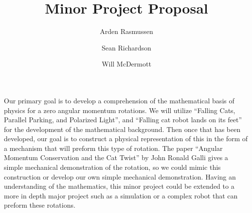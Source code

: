\documentclass[12pt]{amsart}
\title{Minor Project Proposal}
\author{Arden Rasmussen \and Sean Richardson \and Will McDermott}
\begin{document}
\maketitle

Our primary goal is to develop a comprehension of the mathematical basis of
physics for a zero angular momentum rotations. We will utilize ``Falling Cats,
Parallel Parking, and Polarized Light'', and ``Falling cat robot lands on its
feet'' for the development of the mathematical background. Then once that has
been developed, our goal is to construct a physical representation of this in
the form of a mechanism that will preform this type of rotation. The paper
``Angular Momentum Conservation and the Cat Twist'' by John Ronald Galli gives
a simple mechanical demonstration of the rotation, so we could mimic this
construction or develop our own simple mechanical demonstration.
Having an understanding of the mathematics, this minor project could be
extended to a more in depth major project such as a simulation or a complex
robot that can preform these rotations.
\end{document}
